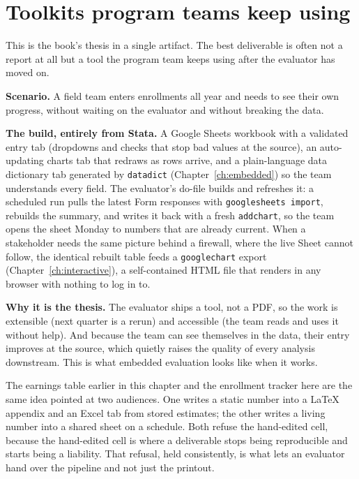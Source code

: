 \documentclass[
    a4paper,
    fontsize=10pt,
    twoside=true,
    numbers=noenddot,
]{kaobook}
\newcounter{appliedexample}
\newenvironment{appliedexample}[1][]{%
    \refstepcounter{appliedexample}%
    \begin{appliedexamplebox}[frametitle={Applied Example~\theappliedexample.~~#1}]%
}{%
    \end{appliedexamplebox}%
}
\begin{document}
\section{Toolkits program teams keep using}\label{sec:teamtoolkit}
This is the book's thesis in a single artifact. The best deliverable is often not a report at all but a tool the program team keeps using after the evaluator has moved on.

\begin{appliedexample}[An enrollment tracker the field team keeps]
\textbf{Scenario.} A field team enters enrollments all year and needs to see their own progress, without waiting on the evaluator and without breaking the data.

\medskip
\textbf{The build, entirely from Stata.} A Google Sheets workbook with a validated entry tab (dropdowns and checks that stop bad values at the source), an auto-updating charts tab that redraws as rows arrive, and a plain-language data dictionary tab generated by \texttt{datadict} (Chapter~\ref{ch:embedded}) so the team understands every field. The evaluator's do-file builds and refreshes it: a scheduled run pulls the latest Form responses with \texttt{googlesheets import}, rebuilds the summary, and writes it back with a fresh \texttt{addchart}, so the team opens the sheet Monday to numbers that are already current. When a stakeholder needs the same picture behind a firewall, where the live Sheet cannot follow, the identical rebuilt table feeds a \texttt{googlechart} export (Chapter~\ref{ch:interactive}), a self-contained HTML file that renders in any browser with nothing to log in to.

\medskip
\textbf{Why it is the thesis.} The evaluator ships a tool, not a PDF, so the work is extensible (next quarter is a rerun) and accessible (the team reads and uses it without help). And because the team can see themselves in the data, their entry improves at the source, which quietly raises the quality of every analysis downstream. This is what embedded evaluation looks like when it works.
\end{appliedexample}

The earnings table earlier in this chapter and the enrollment tracker here are the same idea pointed at two audiences. One writes a static number into a \LaTeX{} appendix and an Excel tab from stored estimates; the other writes a living number into a shared sheet on a schedule. Both refuse the hand-edited cell, because the hand-edited cell is where a deliverable stops being reproducible and starts being a liability. That refusal, held consistently, is what lets an evaluator hand over the pipeline and not just the printout.
\end{document}

